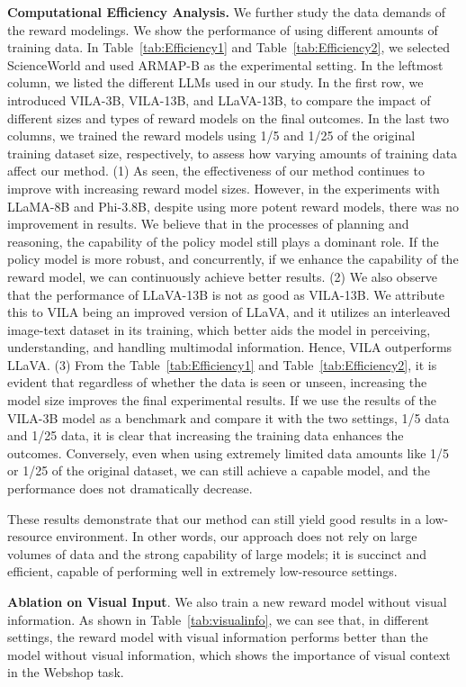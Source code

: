 \textbf{Computational Efficiency Analysis.}
We further study the data demands of the reward modelings. We show the performance of using different amounts of training data. In Table~\ref{tab:Efficiency1} and Table~\ref{tab:Efficiency2}, we selected ScienceWorld and used ARMAP-B as the experimental setting. In the leftmost column, we listed the different LLMs used in our study. In the first row, we introduced VILA-3B, VILA-13B, and LLaVA-13B, to compare the impact of different sizes and types of reward models on the final outcomes. In the last two columns, we trained the reward models using 1/5 and 1/25 of the original training dataset size, respectively, to assess how varying amounts of training data affect our method. (1) As seen, the effectiveness of our method continues to improve with increasing reward model sizes. However, in the experiments with LLaMA-8B and Phi-3.8B, despite using more potent reward models, there was no improvement in results. We believe that in the processes of planning and reasoning, the capability of the policy model still plays a dominant role. If the policy model is more robust, and concurrently, if we enhance the capability of the reward model, we can continuously achieve better results. (2) We also observe that the performance of LLaVA-13B is not as good as VILA-13B. We attribute this to VILA being an improved version of LLaVA, and it utilizes an interleaved image-text dataset in its training, which better aids the model in perceiving, understanding, and handling multimodal information. Hence, VILA outperforms LLaVA. (3) From the Table~\ref{tab:Efficiency1} and Table~\ref{tab:Efficiency2}, it is evident that regardless of whether the data is seen or unseen, increasing the model size improves the final experimental results. If we use the results of the VILA-3B model as a benchmark and compare it with the two settings, 1/5 data and 1/25 data, it is clear that increasing the training data enhances the outcomes. Conversely, even when using extremely limited data amounts like 1/5 or 1/25 of the original dataset, we can still achieve a capable model, and the performance does not dramatically decrease.

These results demonstrate that our method can still yield good results in a low-resource environment. In other words, our approach does not rely on large volumes of data and the strong capability of large models; it is succinct and efficient, capable of performing well in extremely low-resource settings.


\textbf{Ablation on Visual Input}. 
We also train a new reward model without visual information. As shown in Table~\ref{tab:visualinfo}, we can see that, in different settings, the reward model with visual information performs better than the model without visual information, which shows the importance of visual context in the Webshop task.


